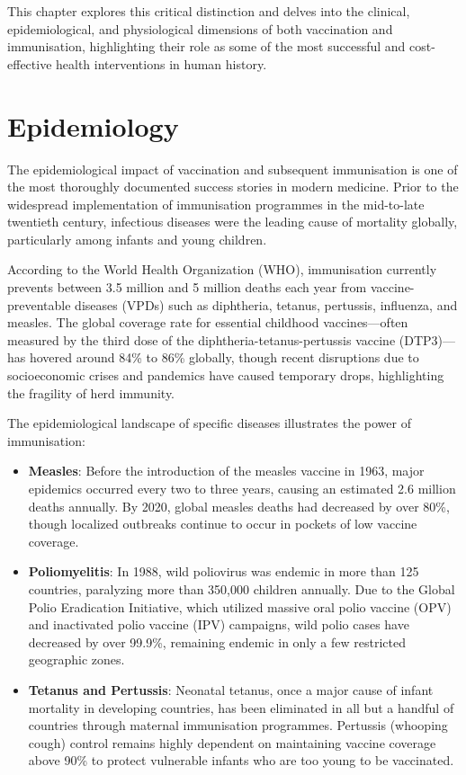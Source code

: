 This chapter explores this critical distinction and delves into the clinical, epidemiological, and physiological dimensions of both vaccination and immunisation, highlighting their role as some of the most successful and cost-effective health interventions in human history.

\section*{Epidemiology}
The epidemiological impact of vaccination and subsequent immunisation is one of the most thoroughly documented success stories in modern medicine. Prior to the widespread implementation of immunisation programmes in the mid-to-late twentieth century, infectious diseases were the leading cause of mortality globally, particularly among infants and young children.

According to the World Health Organization (WHO), immunisation currently prevents between 3.5 million and 5 million deaths each year from vaccine-preventable diseases (VPDs) such as diphtheria, tetanus, pertussis, influenza, and measles. The global coverage rate for essential childhood vaccines—often measured by the third dose of the diphtheria-tetanus-pertussis vaccine (DTP3)—has hovered around 84\% to 86\% globally, though recent disruptions due to socioeconomic crises and pandemics have caused temporary drops, highlighting the fragility of herd immunity.

The epidemiological landscape of specific diseases illustrates the power of immunisation:
\begin{itemize}
    \item \textbf{Measles}: Before the introduction of the measles vaccine in 1963, major epidemics occurred every two to three years, causing an estimated 2.6 million deaths annually. By 2020, global measles deaths had decreased by over 80\%, though localized outbreaks continue to occur in pockets of low vaccine coverage.
    \item \textbf{Poliomyelitis}: In 1988, wild poliovirus was endemic in more than 125 countries, paralyzing more than 350,000 children annually. Due to the Global Polio Eradication Initiative, which utilized massive oral polio vaccine (OPV) and inactivated polio vaccine (IPV) campaigns, wild polio cases have decreased by over 99.9\%, remaining endemic in only a few restricted geographic zones.
    \item \textbf{Tetanus and Pertussis}: Neonatal tetanus, once a major cause of infant mortality in developing countries, has been eliminated in all but a handful of countries through maternal immunisation programmes. Pertussis (whooping cough) control remains highly dependent on maintaining vaccine coverage above 90\% to protect vulnerable infants who are too young to be vaccinated.
\end{itemize}

